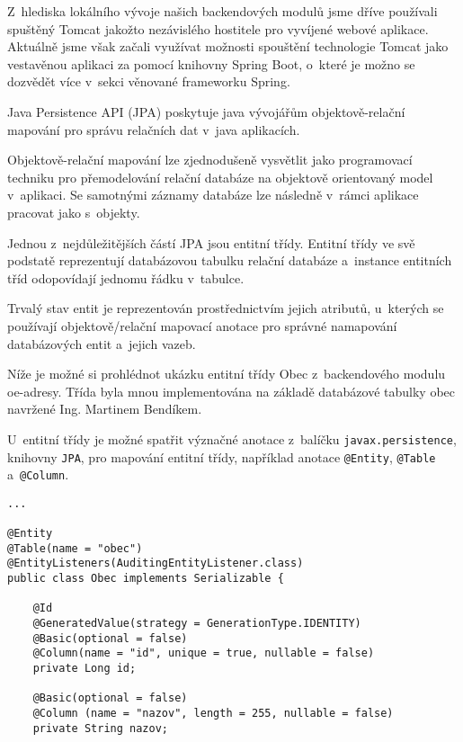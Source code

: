 \documentclass[twoside, 12pt]{article}
\begin{document}
{Z~hlediska lokálního vývoje našich backendových modulů jsme dříve používali
spuštěný Tomcat jakožto nezávislého hostitele pro vyvíjené webové aplikace.
Aktuálně jsme však začali využívat možnosti spouštění technologie Tomcat jako vestavěnou
aplikaci za pomocí knihovny Spring Boot, o~které je možno se dozvědět více v~sekci
věnované frameworku Spring.

Java Persistence API (JPA) poskytuje java vývojářům
objektově-relační mapování pro správu relačních dat v~java aplikacích.

Objektově-relační mapování lze zjednodušeně vysvětlit jako
programovací techniku pro přemodelování relační databáze
na objektově orientovaný model v~aplikaci.
Se samotnými záznamy databáze lze následně v~rámci aplikace pracovat jako s~objekty.


Jednou z~nejdůležitějších částí JPA jsou entitní třídy.
Entitní třídy ve svě podstatě reprezentují databázovou tabulku
relační databáze a~instance entitních tříd odopovídají jednomu řádku v~tabulce.

Trvalý stav entit je reprezentován prostřednictvím jejich atributů,
u~kterých se používají objektově/relační mapovací anotace
pro správné namapování databázových entit a~jejich vazeb.

Níže je možné si prohlédnot ukázku entitní třídy Obec z~backendového
modulu oe-adresy. Třída byla mnou implementována na základě databázové tabulky
obec navržené Ing. Martinem Bendíkem.

U~entitní třídy je možné spatřit
význačné anotace z~balíčku \texttt{javax.persistence}, knihovny \texttt{JPA},
pro mapování entitní třídy, například anotace \texttt{@Entity}, \texttt{@Table}
a~\texttt{@Column}.

\begin{lstlisting}
...

@Entity
@Table(name = "obec")
@EntityListeners(AuditingEntityListener.class)
public class Obec implements Serializable {

    @Id
    @GeneratedValue(strategy = GenerationType.IDENTITY)
    @Basic(optional = false)
    @Column(name = "id", unique = true, nullable = false)
    private Long id;

    @Basic(optional = false)
    @Column (name = "nazov", length = 255, nullable = false)
    private String nazov;


\end{lstlisting}}
\end{document}

